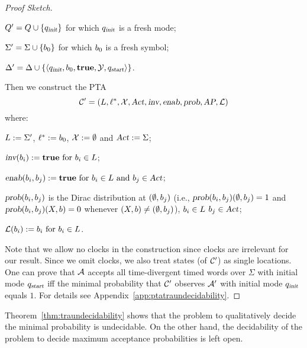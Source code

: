 \begin{proof}[Proof Sketch]
\begin{compactitem}
\item $Q'   = Q  \cup \{ q_{\mbox{\sl\scriptsize init} } \}$ for which $q_{\mbox{\sl\scriptsize init} }$ is a fresh mode;
\item $\Sigma'  = \Sigma \cup \{ b_{0} \}$ for which $b_{0}$ is a fresh symbol;
\item $\Delta'     = \Delta    \cup \{ \langle
            q_{\mbox{\sl\scriptsize init} },
            b_{0},
            \mathbf{true},
            \mathcal{Y},
            q_{\mbox{\sl\scriptsize start}}
        \rangle
    \}$.
\end{compactitem}
Then we construct the PTA
\[
\mathcal{C}'=\left(L, \ell^*, \mathcal{X}, \mbox{\sl Act}, \mbox{\sl inv}, \mbox{\sl enab},  \mbox{\sl prob}, \mbox{\sl AP}, \mathcal{L}\right)
\]
where:
\begin{compactitem}
    \item $L      :=  \Sigma'$, $\ell^*     :=  b_{0} $, $\mathcal{X}    :=  \emptyset $ and $\mbox{\sl Act}      :=  \Sigma $;
    \item $\mbox{\sl inv}(b_{i})              :=  \mathbf{true}
                                            \text{ for }
                                            b_{i} \in L$;
    \item $\mbox{\sl enab}(b_{i},b_{j})   :=  \mathbf{true}
                                            \text{ for }
                                            b_{i} \in L
                                            \text{ and }
                                            b_{j} \in \mbox{\sl Act}$;
    \item $\mbox{\sl prob}(b_{i},b_{j})$ is the Dirac distribution at $(\emptyset,b_{j})$ (i.e., $\mbox{\sl prob}(b_{i},b_{j})(\emptyset,b_{j})=1$ and $\mbox{\sl prob}(b_{i},b_{j})(X,b)=0$ whenever $(X,b)\ne(\emptyset,b_{j})$),
                                            $b_{i} \in L$
                                            $b_{j} \in \mbox{\sl Act}$;
    \item $\mathcal{L}(b_{i})           :=  b_{i}
                                            \text{ for } b_{i} \in L$.
\end{compactitem}
Note that we allow no clocks in the construction since clocks are irrelevant for our result.
Since we omit clocks, we also treat states (of $\mathcal{C}'$) as single locations.
One can prove that $\mathcal{A}$ accepts all time-divergent timed words over $\Sigma$ with initial mode $q_{\mbox{\sl\scriptsize start}}$ iff
the minimal probability that $\mathcal{C}'$ observes $\mathcal{A}'$ with initial mode $q_{\mbox{\sl\scriptsize init} }$ equals $1$.
For details see Appendix~\ref{app:ptatraundecidability}.
\end{proof}

\begin{remark}
Theorem~\ref{thm:traundecidability} shows that the problem to qualitatively decide the minimal probability is undecidable.
On the other hand, the decidability of the problem to decide maximum acceptance probabilities is left open.
\end{remark}
